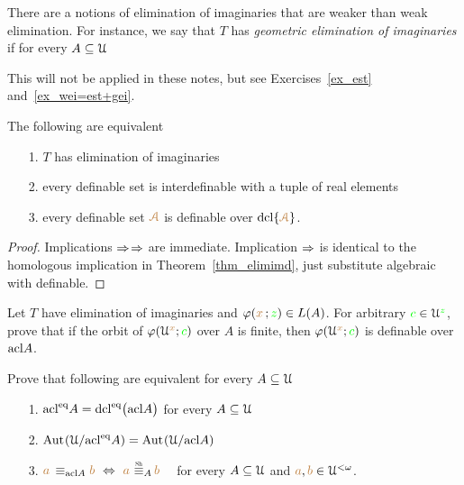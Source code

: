 There are a notions of elimination of imaginaries that are weaker than weak elimination.
For instance, we say that $T$ has \emph{geometric elimination of imaginaries\/} if for every $A\subseteq\EuScript U$

\ceq{\hfill {\vl\Aa} }{\in}{{\acl}^\eq\big(\acl\{{\vl\Aa}\}\big)}

This will not  be applied in these notes, but see Exercises~\ref{ex_est} and~\ref{ex_wei=est+gei}.

\begin{theorem}\label{elimimf} 
The following are equivalent
\begin{itemize}
\item[1.] $T$ has elimination of imaginaries
\item[2.] every definable set is interdefinable with a tuple of real elements
\item[3.] every definable set ${\color{brown}\EuScript A}$ is definable over ${\rm dcl}\{{\color{brown}\EuScript A}\}$.
\end{itemize}
\end{theorem}

\begin{proof}
Implications $\Rightarrow$$\Rightarrow$ are immediate.
Implication $\Rightarrow$ is identical to the homologous implication in Theorem~\ref{thm_elimimd}, just substitute algebraic with definable.
\end{proof}



\begin{exercise}
  Let $T$ have elimination of imaginaries and $\varphi({\color{brown} x}\,;{\color{green} z})\in L(A)$.
  For arbitrary ${\color{green} c}\in\EuScript U^{\color{green} z}$, prove that if the orbit of $\varphi(\EuScript U^{\color{brown} x}; {\color{green} c})$ over $A$ is finite, then $\varphi(\EuScript U^{\color{brown} x}; {\color{green} c})$ is definable over ${\rm acl} A$.
  \end{exercise}
  
  
  \begin{exercise}\label{ex_est}
    Prove that following are equivalent for every $A\subseteq\EuScript U$
    \begin{itemize}
    \item[1.]  ${\rm acl}^{{\rm eq}} A={\rm dcl}^{{\rm eq}}\big({\rm acl} A\big)$ for every $A\subseteq\EuScript U$
    \item[2.]  ${\rm Aut\kern.15ex}(\EuScript U/{\rm acl}^{{\rm eq}} A)= {\rm Aut\kern.15ex}(\EuScript U/{\rm acl} A)$
    \item[3.] ${\mr a}\,\equiv_{\acl A}{\mr b}\ \IFF\ {\mr a}\ \smash{\equivSh_A}\, {\mr b}$ \ \ for every $A\subseteq\EuScript U$ and  ${\color{brown} a},{\color{brown} b}\in\EuScript U^{<\omega}$.
    \end{itemize} 
  \end{exercise}
  

